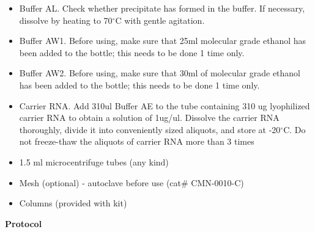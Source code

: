 \documentclass[11pt, oneside]{article}
\begin{document}
		\begin{itemize}[leftmargin=.5in]
		\itemsep0mm
			\item Buffer AL. Check whether precipitate has formed in the buffer. If necessary, dissolve by heating to 70$^{\circ}$C with gentle agitation. 
			\item Buffer AW1. Before using, make sure that 25ml molecular grade ethanol has been added to the bottle; this needs to be done 1 time only. 
			\item Buffer AW2. Before using, make sure that 30ml of molecular grade ethanol has been added to the bottle; this needs to be done 1 time 			only. 
			\item Carrier RNA. Add 310ul Buffer AE to the tube containing 310 ug lyophilized carrier RNA to obtain a solution of 1ug/ul. Dissolve the 				carrier RNA thoroughly, divide it into conveniently sized aliquots, and store at -20$^{\circ}$C. Do not freeze-thaw the aliquots of carrier RNA 			more than 3 times
			\item 1.5 ml microcentrifuge tubes (any kind)
			\item Mesh (optional) - autoclave before use (cat\# CMN-0010-C)
			\item Columns (provided with kit)
		\end{itemize}
		
		\vspace{5mm}
		
		
		{\bf Protocol}
\end{document}
